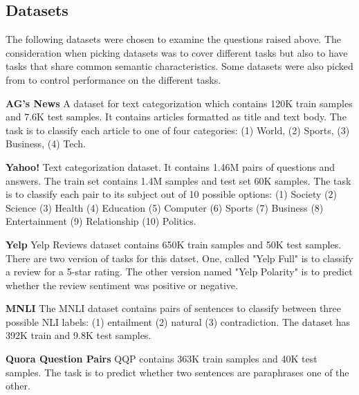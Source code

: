 \documentclass[11pt,a4paper]{article}
\begin{document}
\subsection{Datasets}
\label{apx:datasets}
The following datasets were chosen to examine the questions raised above.
The consideration when picking datasets was to cover different tasks but also to have tasks that share common semantic characteristics. 
Some datasets were also picked from \citet{schick2020exploiting} to control performance on the different tasks.

\vspace{8pt}
\noindent \textbf{AG's News} \quad
A dataset for text categorization which contains 120K train samples and 7.6K test samples.
It contains articles formatted as title and text body.
The task is to classify each article to one of four categories: (1) World, (2) Sports, (3) Business, (4) Tech.

\vspace{8pt}
\noindent \textbf{Yahoo!} \quad
Text categorization dataset. It contains 1.46M pairs of questions and answers.
The train set contains 1.4M samples and test set 60K samples.
The task is to classify each pair to its subject out of 10 possible options: (1) Society (2) Science (3) Health (4) Education (5) Computer (6) Sports (7) Business (8) Entertainment (9) Relationship (10) Politics.

\vspace{8pt}
\noindent \textbf{Yelp} \quad
Yelp Reviews dataset contains 650K train samples and 50K test samples.
There are two version of tasks for this datset.
One, called "Yelp Full" is to classify a review for a 5-star rating.
The other version named "Yelp Polarity" is to predict whether the review sentiment was positive or negative.

\vspace{8pt}
\noindent \textbf{MNLI} \quad
The MNLI dataset contains pairs of sentences to classify between three possible NLI labels: (1) entailment (2) natural (3) contradiction. 
The dataset has 392K train and 9.8K test samples.

\vspace{8pt}
\noindent \textbf{Quora Question Pairs} \quad
QQP contains 363K train samples and 40K test samples.
The task is to predict whether two sentences are paraphrases one of the other.
\end{document}
